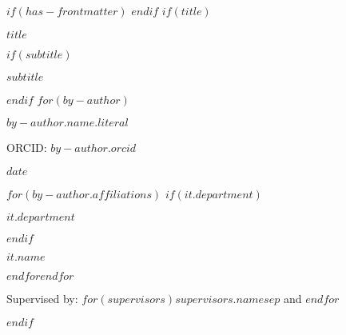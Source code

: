 $if(has-frontmatter)$
\frontmatter
$endif$
$if(title)$
\cleardoublepage
\thispagestyle{empty}
{\centering
{\Huge\bfseries $title$ \par}
$if(subtitle)$
\vspace{3ex}
{\Large\bfseries $subtitle$ \par}
$endif$
\vspace{12ex}
$for(by-author)$
{\Large\bfseries $by-author.name.literal$ \par}
\vspace{3ex}
{\Large ORCID: $by-author.orcid$ \par}
{\bfseries\large $date$ \par}
\vspace{12ex}
$for(by-author.affiliations)$%
$if(it.department)$%
{\bfseries\large $it.department$ \par}
\vspace{3ex}
$endif$%
{\bfseries\large $it.name$ \par}
$endfor$$endfor$%
\vspace{12ex}
{\small Supervised by: $for(supervisors)$$supervisors.name$$sep$ and $endfor$\par}
}
$endif$